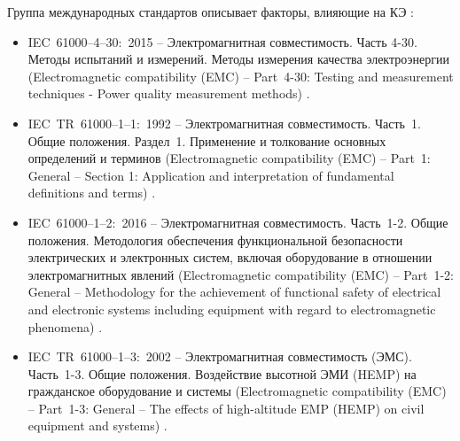 Группа международных стандартов описывает факторы, влияющие на КЭ \cite{IEEE_519-2014, IEEE_1159-2019, IEEE_1159.3-2019, IEEE_1250-2018, IEEE_1564-2014, IEEE_1409-2012, IEEE_1453-2015, IEEE_1159-2009}:

\begin{itemize}
	\item IEC~61000--4--30:~2015 -- Электромагнитная совместимость. Часть 4-30. Методы испытаний и измерений. Методы измерения качества электроэнергии (Electromagnetic compatibility (EMC) -- Part~4-30: Testing and measurement techniques - Power quality measurement methods) \cite{IEC61000-4-30:2015}.
	\item IEC~TR~61000--1--1:~1992 -- Электромагнитная совместимость. Часть~1. Общие положения. Раздел~1. Применение и толкование основных определений и терминов (Electromagnetic compatibility (EMC) -- Part~1: General -- Section 1: Application and interpretation of fundamental definitions and terms) \cite{IEC_TR_61000-1-1:1992}.
	\item IEC~61000--1--2:~2016 -- Электромагнитная совместимость. Часть~1-2. Общие положения. Методология обеспечения функциональной безопасности электрических и электронных систем, включая оборудование в отношении электромагнитных явлений (Electromagnetic compatibility (EMC) -- Part~1-2: General -- Methodology for the achievement of functional safety of electrical and electronic systems including equipment with regard to electromagnetic phenomena) \cite{IEC61000-1-2:2016}.
	\item IEC~TR~61000--1--3:~2002 -- Электромагнитная совместимость (ЭМС). Часть~1-3. Общие положения. Воздействие высотной ЭМИ (HEMP) на гражданское оборудование и системы (Electromagnetic compatibility (EMC) -- Part~1-3: General -- The effects of high-altitude EMP (HEMP) on civil equipment and systems) \cite{IECTR61000-1-3:2002}.
\end{itemize}




